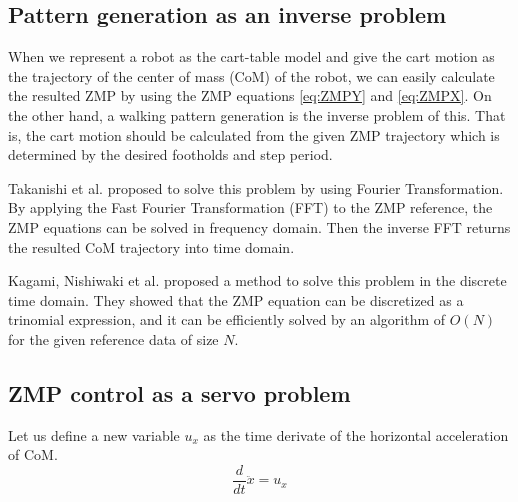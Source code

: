 \subsection{Pattern generation as an inverse problem}

When we represent a robot as the cart-table model and give
the cart motion as the trajectory of the center of mass (CoM) of the robot,
we can easily calculate the resulted ZMP by using the ZMP equations
\ref{eq:ZMPY} and \ref{eq:ZMPX}.
On the other hand, a walking pattern generation is the inverse problem of
this. That is, the cart motion should be calculated from the given ZMP
trajectory which is determined by the desired footholds and step period.
\par
Takanishi et al. proposed to solve this problem by using Fourier Transformation.
By applying the Fast Fourier Transformation (FFT) to the ZMP reference,
the ZMP equations can be solved in frequency domain. Then the inverse
FFT returns the resulted CoM trajectory into time domain.
\par
Kagami, Nishiwaki et al. proposed a method to solve this problem in the discrete
time domain. They showed that the ZMP equation can be discretized as a trinomial expression,
and it can be efficiently solved by an algorithm of $O(N)$ for the given reference data
of size $N$.
\subsection{ZMP control as a servo problem}
Let us define a new variable $u_x$ as the time derivate of the horizontal acceleration of CoM.
\begin{equation}
\frac{d}{dt}\ddot{x} = u_x
\label{eq:CoMAcceleration}
\end{equation}

